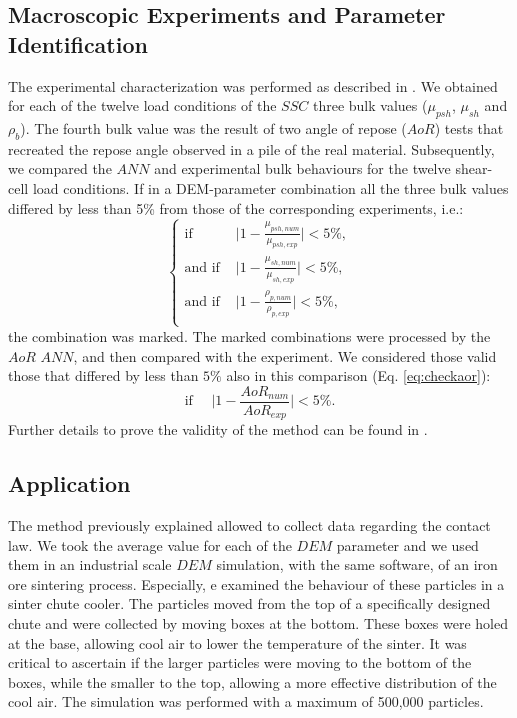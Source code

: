 \documentclass{CFD2015}
\begin{document}
\subsection{Macroscopic Experiments and Parameter Identification}
\label{subsec:macroscopicexperimentsparameteridentification}
The experimental characterization was performed as described in
\citet{RefWorks:180}. 
We obtained for each of the twelve load conditions of the $SSC$ three bulk
values ($\mu_{psh}$, $\mu_{sh}$ and $\rho_b$).
The fourth bulk value was the result of two angle of repose ($AoR$) tests that
recreated the repose angle observed in a pile of the
real material.
Subsequently, we compared the $ANN$ and experimental bulk behaviours for the
twelve shear-cell load conditions.
If in a DEM-parameter combination all the three bulk values differed by less 
than 5\% from those of the corresponding experiments, i.e.:
\begin{equation}
 \begin{cases}
\text{if } & \lvert{1-\frac{\mu_{psh,num}}{\mu_{psh,exp}}}\rvert < 5\%  ,\\
\text{and if } & \lvert{1-\frac{\mu_{sh,num}}{\mu_{sh,exp}}}\rvert < 5\% , \\ 
\text{and if } & \lvert{1-\frac{\rho_{p,num}}{\rho_{p,exp}}}\rvert < 5\% ,\\ 
\end{cases}
 \label{eq:check2}
\end{equation}
the combination was marked. The marked combinations were processed by the
$AoR$ $ANN$, and then compared with the experiment.
We considered those valid those that differed by less than $5\%$ also in this
comparison (Eq. \ref{eq:checkaor}):
\begin{equation}
\text{if} ~~~~~~ \lvert{1-\frac{AoR_{num}}{AoR_{exp}}}\rvert < 5\% .
\label{eq:checkaor}
\end{equation}
Further details to prove the validity of the method can be found in
\citet{RefWorks:180}.

\subsection{Application}
\label{subsec:application}

The method previously explained allowed to collect data regarding the contact
law. We took the average value for each of the $DEM$ parameter and we used them
in an industrial scale $DEM$ simulation, with the same software, of an iron ore
sintering process.
Especially, e examined the behaviour of these particles in a sinter chute
cooler. The particles moved from the top of a specifically designed chute and
were collected by moving boxes at the bottom.
These boxes were holed at the base, allowing cool air to lower the temperature
of the sinter.
It was critical to ascertain if the larger particles were moving to the bottom
of the boxes, while the smaller to the top, allowing a more effective
distribution of the cool air.
The simulation was performed with a maximum of 500,000 particles.
\end{document}
